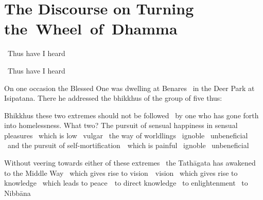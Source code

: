 
\section{The Discourse on Turning \mbox{the}~Wheel~of~Dhamma}
\label{wheel-of-dhamma-full}

\ifninebythirteen

\vspace{0.1cm}

\begin{leader-english}
  \anglebracketleft\ \hspace{-0.5mm}Thus have I heard \hspace{-0.5mm}\anglebracketright\
\end{leader-english}

\vspace{-0.2cm}

\else

\begin{leader-english}
  \anglebracketleft\ \hspace{-0.5mm}Thus have I heard \hspace{-0.5mm}\anglebracketright\
\end{leader-english}

\fi

\begin{english-only-hang}
  On one occasion the Blessed One was dwelling at Benares \breathmark\ in the Deer Park at Isipatana. There he addressed the bhikkhus of the group of five thus:
\end{english-only-hang}

\begin{english-only-hang}
  Bhikkhus these two extremes should not be followed \breathmark\ by one who has gone forth into homelessness. What two? The pursuit of sensual happiness in sensual pleasures \breathmark\ which is low \breathmark\ vulgar \breathmark\ the way of worldlings \breathmark\ ignoble \breathmark\ unbeneficial \breathmark\ and the pursuit of \mbox{self-mortification}~\breathmark\ which is painful \breathmark\ ignoble \breathmark\ unbeneficial
\end{english-only-hang}

\begin{english-only-hang}
  Without veering towards either of these extremes \breathmark\ the Tathāgata has awakened to the Middle Way \breathmark\ which gives rise to \ifbfive \mbox{vision}~\breathmark\ \else vision \breathmark\ \fi which gives rise to knowledge \breathmark\ which leads to \mbox{peace}~\breathmark\ to direct knowledge \breathmark\ to enlightenment \breathmark\ to Nibbāna
\end{english-only-hang}


